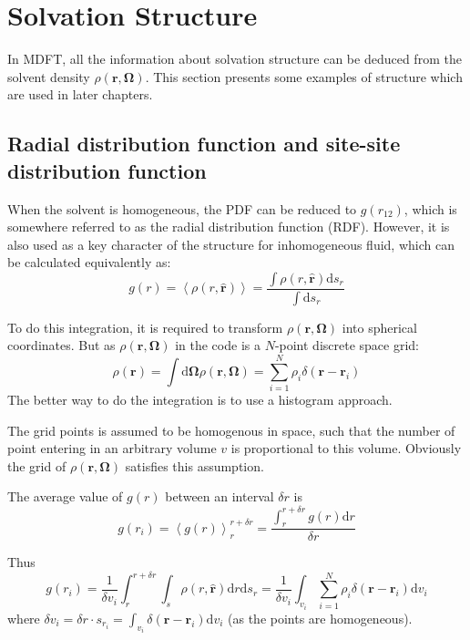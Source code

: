 
\chapter{Solvation Structure\label{chpt:solvation-structure}}

In MDFT, all the information about solvation structure can be deduced
from the solvent density $\rho(\mathbf{r},\mathbf{\Omega})$. This
section presents some examples of structure which are used in later
chapters.

\section{Radial distribution function and site-site distribution function}

When the solvent is homogeneous, the \acs{PDF} can be reduced to
$g(r_{12})$, which is somewhere referred to as the radial distribution
function (\acs{RDF}). However, it is also used as a key character
of the structure for inhomogeneous fluid, which can be calculated
equivalently as:
\begin{equation}
g(r)=\left\langle \rho(r,\hat{\mathbf{r}})\right\rangle =\dfrac{\int\rho(r,\hat{\mathbf{r}})\mathrm{d}s_{r}}{\int\mathrm{d}s_{r}}
\end{equation}

To do this integration, it is required to transform $\rho(\mathbf{r},\mathbf{\Omega})$
into spherical coordinates. But as $\rho(\mathbf{r},\mathbf{\Omega})$
in the code is a $N$-point discrete space grid:
\begin{equation}
\rho(\mathbf{r})=\int\mathrm{d}\mathbf{\Omega}\rho(\mathbf{r},\mathbf{\Omega})=\sum_{i=1}^{N}\rho_{i}\delta(\mathbf{r}-\mathbf{r}_{i})
\end{equation}
The better way to do the integration is to use a histogram approach.

The grid points is assumed to be homogenous in space, such that the
number of point entering in an arbitrary volume $v$ is proportional
to this volume. Obviously the grid of $\rho(\mathbf{r},\mathbf{\Omega})$
satisfies this assumption.

The average value of $g(r)$ between an interval $\delta r$ is
\begin{equation}
g(r_{i})=\left\langle g(r)\right\rangle _{r}^{r+\delta r}=\dfrac{\int_{r}^{r+\delta r}g(r)\mathrm{d}r}{\delta r}
\end{equation}

Thus
\begin{equation}
g(r_{i})=\dfrac{1}{\delta v_{i}}\int_{r}^{r+\delta r}\int_{s}\rho(r,\hat{\mathbf{r}})\mathrm{d}r\mathrm{d}s_{r}=\dfrac{1}{\delta v_{i}}\int_{v_{i}}\sum_{i=1}^{N}\rho_{i}\delta(\mathbf{r}-\mathbf{r}_{i})\mathrm{d}v_{i}
\end{equation}
where $\delta v_{i}=\delta r\cdot s_{r_{i}}=\int_{v_{i}}\delta(\mathbf{r}-\mathbf{r}_{i})\mathrm{d}v_{i}$
(as the points are homogeneous). 

